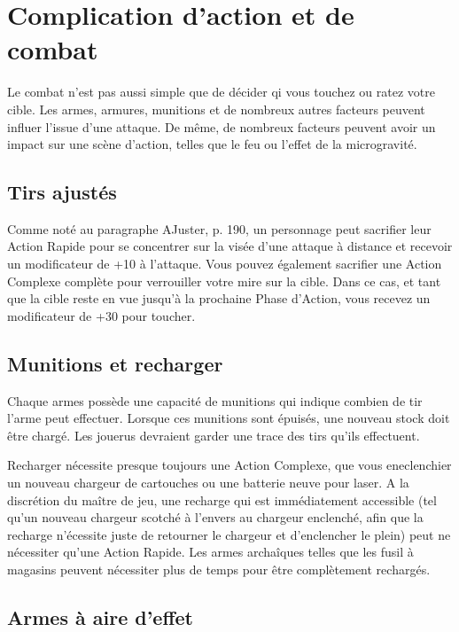 \section{Complication d'action et de combat} \label{sec:action-combat-comp} 

Le combat n'est pas aussi simple que de décider qi vous touchez ou ratez votre cible. Les armes, armures, munitions et de nombreux autres facteurs peuvent influer l'issue d'une attaque. De même, de nombreux facteurs peuvent avoir un impact sur une scène d'action, telles que le feu ou l'effet de la microgravité. 

\subsection{Tirs ajustés} \label{sec:aimed-shots} 

Comme noté au paragraphe AJuster, p. 190, un personnage peut sacrifier leur Action Rapide pour se concentrer sur la visée d'une attaque à distance et recevoir un modificateur de +10 à l'attaque. Vous pouvez également sacrifier une Action Complexe complète pour verrouiller votre mire sur la cible. Dans ce cas, et tant que la cible reste en vue jusqu'à la prochaine Phase d'Action, vous recevez un modificateur de +30 pour toucher. 

\subsection{Munitions et recharger} \label{sec:ammunition-reloading} 

Chaque armes possède une capacité de munitions qui indique combien de tir l'arme peut effectuer. Lorsque ces munitions sont épuisés, une nouveau stock doit être chargé. Les jouerus devraient garder une trace des tirs qu'ils effectuent. 

Recharger nécessite presque toujours une Action Complexe, que vous eneclenchier un nouveau chargeur de cartouches ou une batterie neuve pour laser. A la discrétion du maître de jeu, une recharge qui est immédiatement accessible (tel qu'un nouveau chargeur scotché à l'envers au chargeur enclenché, afin que la recharge n'écessite juste de retourner le chargeur et d'enclencher le plein) peut ne nécessiter qu'une Action Rapide. Les armes archaîques telles que les fusil à magasins peuvent nécessiter plus de temps pour être complètement rechargés. 

\subsection{Armes à aire d'effet} \label{sec:area-effect-weapons} 

